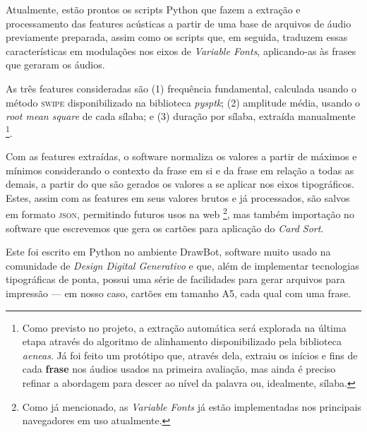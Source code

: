 \documentclass[a4paper,11pt,titlepage,singlespacing]{article}
\let\svthefootnote\thefootnote
\newcommand\Cfootnote[2][black]{\def\thefootnote{\color{#1}\svthefootnote}%
  \footnote{\color{#1}#2}}
\begin{document}
{    Atualmente, estão prontos os scripts Python que fazem a extração e processamento das features acústicas a partir de uma base de arquivos de áudio previamente preparada, assim como os scripts que, em seguida, traduzem essas características em modulações nos eixos de \textit{Variable Fonts}, aplicando-as às frases que geraram os áudios.
    
    As três features consideradas são (1) frequência fundamental, calculada usando o método \textsc{swipe} disponibilizado na biblioteca \textit{pysptk}; (2) amplitude média, usando o \textit{root mean square} de cada sílaba; e (3) duração por sílaba, extraída manualmente\Cfootnote[pos_parecer]{Como previsto no projeto, a extração automática será explorada na última etapa através do algoritmo de alinhamento disponibilizado pela biblioteca \textit{aeneas}. Já foi feito um protótipo que, através dela, extraiu os inícios e fins de cada \textbf{frase} nos áudios usados na primeira avaliação, mas ainda é preciso refinar a abordagem para descer ao nível da palavra ou, idealmente, sílaba.}.
    
    Com as features extraídas, o software normaliza os valores a partir de máximos e mínimos considerando o contexto da frase em si e da frase em relação a todas as demais, a partir do que são gerados os valores a se aplicar nos eixos tipográficos. Estes, assim com as features em seus valores brutos e já processados, são salvos em formato \textsc{json}, permitindo futuros usos na web\Cfootnote[pos_parecer]{Como já mencionado, as \textit{Variable Fonts} já estão implementadas nos principais navegadores em uso atualmente.}, mas também importação no software que escrevemos que gera os cartões para aplicação do \textit{Card Sort}.
    
    Este foi escrito em Python no ambiente DrawBot, software muito usado na comunidade de \textit{Design Digital Generativo} e que, além de implementar tecnologias tipográficas de ponta, possui uma série de facilidades para gerar arquivos para impressão — em nosso caso, cartões em tamanho A5, cada qual com uma frase.
    
    
}
\end{document}
